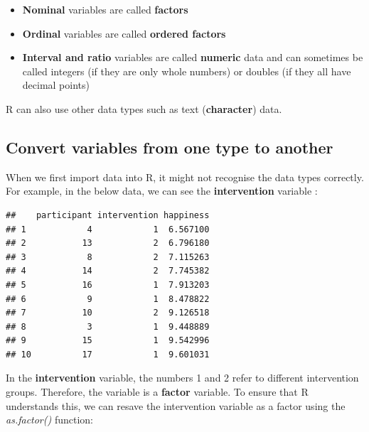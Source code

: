 \documentclass[
]{book}
\newenvironment{Shaded}{\begin{snugshade}}{\end{snugshade}}
\newcommand{\KeywordTok}[1]{\textcolor[rgb]{0.13,0.29,0.53}{\textbf{#1}}}
\newcommand{\NormalTok}[1]{#1}
\newcommand{\OperatorTok}[1]{\textcolor[rgb]{0.81,0.36,0.00}{\textbf{#1}}}
\newcommand{\StringTok}[1]{\textcolor[rgb]{0.31,0.60,0.02}{#1}}
\providecommand{\tightlist}{%
  \setlength{\itemsep}{0pt}\setlength{\parskip}{0pt}}
\begin{document}
\begin{itemize}
\tightlist
\item
  \textbf{Nominal} variables are called \textbf{factors}
\item
  \textbf{Ordinal} variables are called \textbf{ordered factors}
\item
  \textbf{Interval and ratio} variables are called \textbf{numeric} data and can sometimes be called integers (if they are only whole numbers) or doubles (if they all have decimal points)
\end{itemize}

R can also use other data types such as text (\textbf{character}) data.

\hypertarget{convert-variables-from-one-type-to-another}{%
\subsection{Convert variables from one type to another}\label{convert-variables-from-one-type-to-another}}

When we first import data into R, it might not recognise the data types correctly. For example, in the below data, we can see the \textbf{intervention} variable :

\begin{verbatim}
##    participant intervention happiness
## 1            4            1  6.567100
## 2           13            2  6.796180
## 3            8            2  7.115263
## 4           14            2  7.745382
## 5           16            1  7.913203
## 6            9            1  8.478822
## 7           10            2  9.126518
## 8            3            1  9.448889
## 9           15            1  9.542996
## 10          17            1  9.601031
\end{verbatim}

In the \textbf{intervention} variable, the numbers 1 and 2 refer to different intervention groups. Therefore, the variable is a \textbf{factor} variable. To ensure that R understands this, we can resave the intervention variable as a factor using the \emph{as.factor()} function:

\begin{Shaded}
\end{Shaded}
\end{document}

